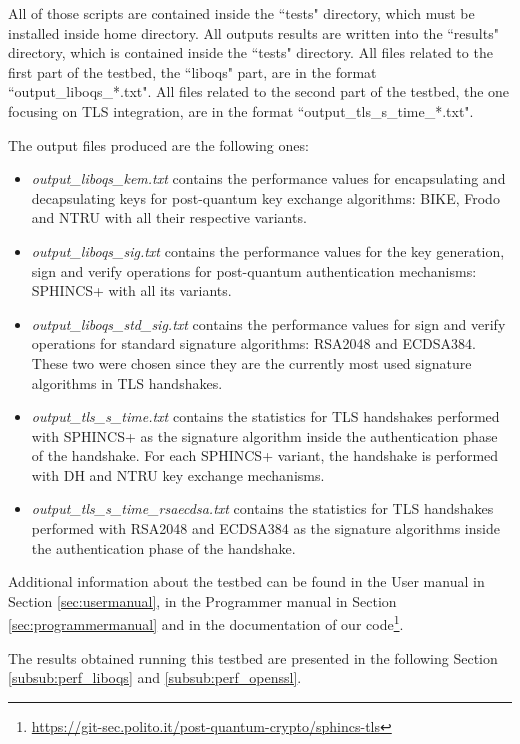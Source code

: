 \documentclass[a4paper,12pt]{article}
\begin{document}
All of those scripts are contained inside the ``tests" directory, which must be installed inside home directory. All outputs results are written into the ``results" directory, which is contained inside the ``tests" directory.
All files related to the first part of the testbed, the ``liboqs" part, are in the format ``output\_liboqs\_*.txt".
All files related to the second part of the testbed, the one focusing on TLS integration, are in the format ``output\_tls\_s\_time\_*.txt".

The output files produced are the following ones:
\begin{itemize}
    \item \textit{output\_liboqs\_kem.txt} contains the performance values for encapsulating and decapsulating keys for post-quantum key exchange algorithms: BIKE, Frodo and NTRU with all their respective variants.
    \item \textit{output\_liboqs\_sig.txt} contains the performance values for the key generation, sign and verify operations for post-quantum authentication mechanisms: SPHINCS+ with all its variants.
    \item \textit{output\_liboqs\_std\_sig.txt} contains the performance values for sign and verify operations for standard signature algorithms: RSA2048 and ECDSA384. These two were chosen since they are the currently most used signature algorithms in TLS handshakes.
    \item \textit{output\_tls\_s\_time.txt} contains the statistics for TLS handshakes performed with SPHINCS+ as the signature algorithm inside the authentication phase of the handshake. For each SPHINCS+ variant, the handshake is performed with DH and NTRU key exchange mechanisms.
    \item \textit{output\_tls\_s\_time\_rsaecdsa.txt} contains the statistics for TLS handshakes performed with RSA2048 and ECDSA384 as the signature algorithms inside the authentication phase of the handshake.
\end{itemize}

Additional information about the testbed can be found in the User manual in Section \ref{sec:usermanual}, in the Programmer manual in Section \ref{sec:programmermanual} and in the documentation of our code\footnote{\url{https://git-sec.polito.it/post-quantum-crypto/sphincs-tls}}.

The results obtained running this testbed are presented in the following Section \ref{subsub:perf_liboqs} and \ref{subsub:perf_openssl}.
\end{document}

